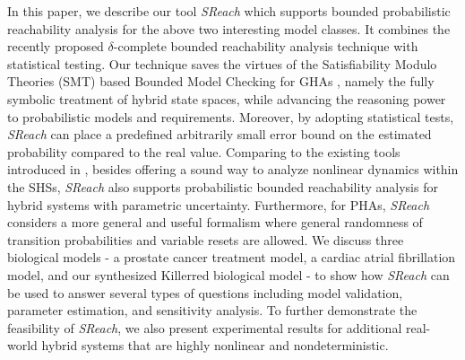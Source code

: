 In this paper, we describe our tool {\it SReach} which supports bounded probabilistic reachability analysis for the above two interesting model classes. It combines the recently proposed $\delta$-complete bounded reachability analysis technique \cite{gaodelta} with statistical testing. Our technique saves the virtues of the Satisfiability Modulo Theories (SMT) based Bounded Model Checking for GHAs \cite{cordeiro2012smt, tinelli2012smt}, namely the fully symbolic treatment of hybrid state spaces, while advancing the reasoning power to probabilistic models and requirements. Moreover, by adopting statistical tests, {\it SReach} can place a predefined arbitrarily small error bound on the estimated probability compared to the real value. Comparing to the existing tools introduced in \cite{zhang2012safety, franzle2008stochastic, david2012statistical, website:prism}, besides offering a sound way to analyze nonlinear dynamics within the SHSs, {\it SReach} also supports probabilistic bounded reachability analysis for hybrid systems with parametric uncertainty. Furthermore, for PHAs, {\it SReach} considers a more general and useful formalism where general randomness of transition probabilities and variable resets are allowed. We discuss three biological models - a prostate cancer treatment model, a cardiac atrial fibrillation model, and our synthesized Killerred biological model - to show how {\it SReach} can be used to answer several types of questions including model validation, parameter estimation, and sensitivity analysis. To further demonstrate the feasibility of {\it SReach}, we also present experimental results for additional real-world hybrid systems that are highly nonlinear and nondeterministic.

